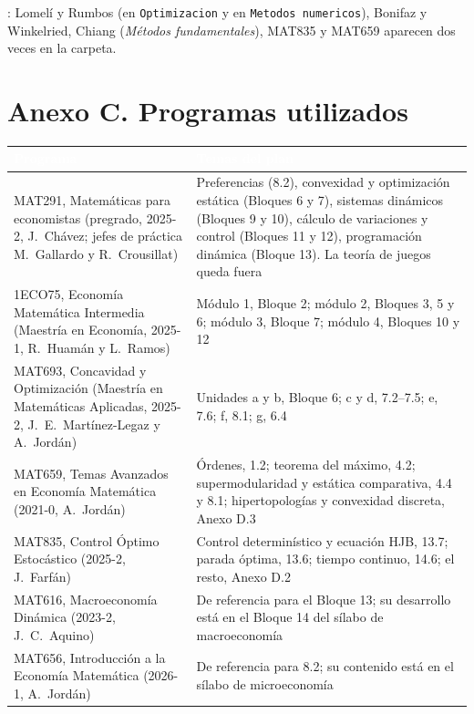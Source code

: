 \documentclass[11pt,a4paper]{article}
\newcommand{\cab}[1]{\textcolor{white}{\sffamily\bfseries #1}}
\newcommand{\filasalternas}{\rowcolors{2}{white}{tonoPalido}}
\newcommand{\destacado}[1]{{\sffamily\bfseries\color{tonoPrincipal}#1}}
\begin{document}
\medskip
\noindent\destacado{Duplicados}: Lomelí y Rumbos (en \texttt{Optimizacion} y en
\texttt{Metodos numericos}), Bonifaz y Winkelried, Chiang (\emph{Métodos
fundamentales}), MAT835 y MAT659 aparecen dos veces en la carpeta.

\section*{Anexo C. Programas utilizados}

{\small\filasalternas
\noindent\begin{tabularx}{\textwidth}{>{\raggedright\arraybackslash}p{5.6cm}X}
\toprule
\rowcolor{tonoOscuro}\cab{Programa} & \cab{Temas del plan} \\
\midrule
MAT291, Matemáticas para economistas (pregrado, 2025-2, J.~Chávez; jefes de práctica M.~Gallardo y R.~Crousillat) & Preferencias (8.2), convexidad y optimización estática (Bloques 6 y 7), sistemas dinámicos (Bloques 9 y 10), cálculo de variaciones y control (Bloques 11 y 12), programación dinámica (Bloque 13). La teoría de juegos queda fuera \\
1ECO75, Economía Matemática Intermedia (Maestría en Economía, 2025-1, R.~Huamán y L.~Ramos) & Módulo 1, Bloque 2; módulo 2, Bloques 3, 5 y 6; módulo 3, Bloque 7; módulo 4, Bloques 10 y 12 \\
MAT693, Concavidad y Optimización (Maestría en Matemáticas Aplicadas, 2025-2, J.~E.~Martínez-Legaz y A.~Jordán) & Unidades a y b, Bloque 6; c y d, 7.2--7.5; e, 7.6; f, 8.1; g, 6.4 \\
MAT659, Temas Avanzados en Economía Matemática (2021-0, A.~Jordán) & Órdenes, 1.2; teorema del máximo, 4.2; supermodularidad y estática comparativa, 4.4 y 8.1; hipertopologías y convexidad discreta, Anexo D.3 \\
MAT835, Control Óptimo Estocástico (2025-2, J.~Farfán) & Control determinístico y ecuación HJB, 13.7; parada óptima, 13.6; tiempo continuo, 14.6; el resto, Anexo D.2 \\
MAT616, Macroeconomía Dinámica (2023-2, J.~C.~Aquino) & De referencia para el Bloque 13; su desarrollo está en el Bloque 14 del sílabo de macroeconomía \\
MAT656, Introducción a la Economía Matemática (2026-1, A.~Jordán) & De referencia para 8.2; su contenido está en el sílabo de microeconomía \\
\bottomrule
\end{tabularx}
}
\end{document}
